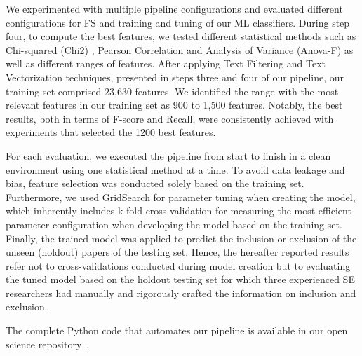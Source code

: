 We experimented with multiple pipeline configurations and evaluated different configurations for FS and training and tuning of our ML classifiers. During step four, to compute the best features, we tested different statistical methods such as Chi-squared (Chi2) \cite{Chi2}, Pearson Correlation \cite{pearson_r} and Analysis of Variance (Anova-F) \cite{ANOVA} as well as different ranges of features. After applying Text Filtering and Text Vectorization techniques, presented in steps three and four of our pipeline, our training set comprised 23,630 features. We identified the range with the most relevant features in our training set as 900 to 1,500 features. Notably, the best results, both in terms of F-score and Recall, were consistently achieved with experiments that selected the 1200 best features.

For each evaluation, we executed the pipeline from start to finish in a clean environment using one statistical method at a time. To avoid data leakage and bias, feature selection was conducted solely based on the training set. Furthermore, we used GridSearch for parameter tuning when creating the model, which inherently includes k-fold cross-validation for measuring the most efficient parameter configuration when developing the model based on the training set. Finally, the trained model was applied to predict the inclusion or exclusion of the unseen (holdout) papers of the testing set. Hence, the hereafter reported results refer not to cross-validations conducted during model creation but to evaluating the tuned model based on the holdout testing set for which three experienced SE researchers had manually and rigorously crafted the information on inclusion and exclusion.

The complete Python code that automates our pipeline is available in our open science repository~\cite{zenodoOpenScience}.